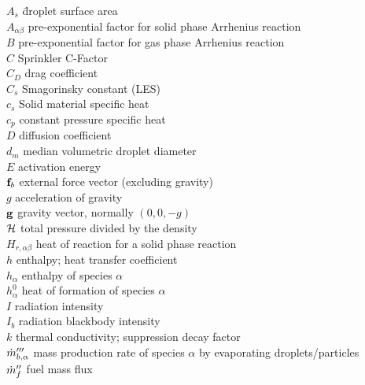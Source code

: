 \documentclass[11pt]{book}
\begin{document}
\begin{tabbing}
$A_s$ \hspace{1in}        \= droplet surface area \\
$A_{\alpha\beta}$          \> pre-exponential factor for solid phase Arrhenius reaction \\
$B$                       \> pre-exponential factor for gas phase Arrhenius reaction \\
$C$                       \> Sprinkler C-Factor \\
$C_D$                     \> drag coefficient \\
$C_s$                     \> Smagorinsky constant (LES)  \\
$c_s$             \> Solid material specific heat \\
$c_p$                     \> constant pressure specific heat \\
$D$                       \> diffusion coefficient   \\
$d_m$                     \> median volumetric droplet diameter \\
$E$                       \> activation energy \\
${\bf f}_b$                  \> external force vector (excluding gravity) \\
$g$                       \> acceleration of gravity \\
${\bf g}$                     \> gravity vector, normally $(0,0,-g)$ \\
$\cal H$                  \> total pressure divided by the density \\
$H_{r,\alpha\beta}$   \> heat of reaction for a solid phase reaction \\
$h$                       \> enthalpy; heat transfer coefficient   \\
$h_\alpha$                \> enthalpy of species $\alpha$   \\
$h_\alpha^0$              \> heat of formation of species $\alpha$   \\
$I$                       \> radiation intensity   \\
$I_b$                     \> radiation blackbody intensity   \\
$k$                       \> thermal conductivity; suppression decay factor \\
$\dot{m}_{b,\alpha}'''$       \> mass production rate of species $\alpha$ by evaporating droplets/particles \\
$\dot{m}_f''$                 \> fuel mass flux \\

\end{tabbing}
\end{document}

